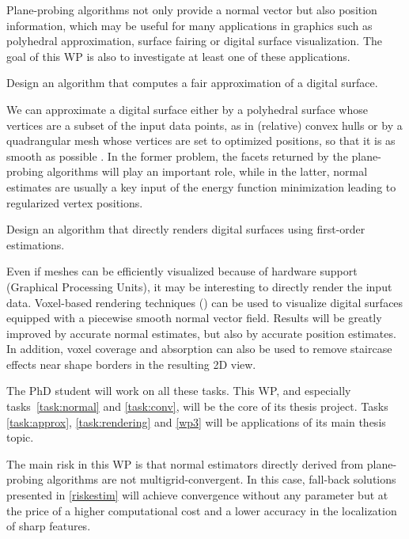 Plane-probing algorithms not only provide a normal vector but also position information,
which may be useful for many applications in graphics such as polyhedral approximation,
surface fairing or digital surface visualization. The goal of this WP is also to investigate
at least one of these applications.   

\begin{Task}
  \label{task:approx}
  Design an algorithm that computes a fair approximation of a digital surface. 
\end{Task}

We can approximate a digital surface either by a polyhedral surface whose vertices 
are a subset of the input data points, as in (relative) convex hulls 
\cite{Klette2001,Schultz2009} 
or by a quadrangular mesh whose vertices are set to optimized positions, so that it is
as smooth as possible \cite{Coeurjolly2017}. In the former problem, the facets returned
by the plane-probing algorithms will play an important role, while in the latter,
normal estimates are usually a key input of the energy function minimization leading
to regularized vertex positions.  

\begin{Task}
  \label{task:rendering}
  Design an algorithm that directly renders digital surfaces using first-order estimations.  
\end{Task}

Even if meshes can be efficiently visualized because of hardware
support (Graphical Processing Units), it may be interesting to
directly render the input data. Voxel-based rendering techniques
(\eg \cite{DBLP:conf/si3d/CrassinNLE09}) can be used to
visualize digital surfaces equipped with a piecewise smooth normal
vector field. Results will be greatly improved by accurate normal estimates,
but also by accurate position estimates. In addition, voxel coverage and absorption can
also be used to remove staircase effects near shape borders in the resulting 2D view.

The PhD student will work on all these tasks. This WP, and especially tasks~\ref{task:normal}
and \ref{task:conv}, will be the core of its thesis project. Tasks \ref{task:approx},
\ref{task:rendering} and \ref{wp3} will be applications of its main thesis topic.  

\Risks
The main risk in this WP is that normal estimators
directly derived from plane-probing algorithms are not multigrid-convergent.
In this case, fall-back solutions presented in \ref{riskestim} will achieve
convergence without any parameter but at the price of a higher computational
cost and a lower accuracy in the localization of sharp features. 

